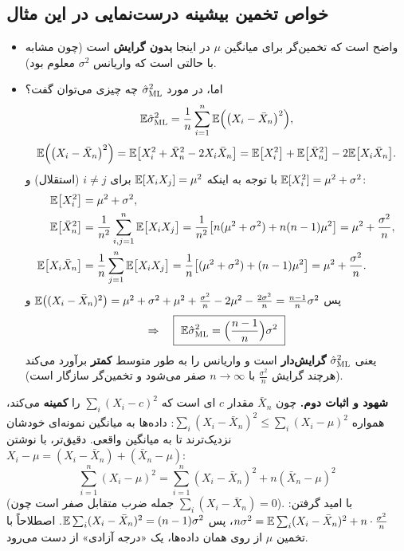 \subsection{خواص تخمین بیشینه درست‌نمایی در این مثال}
\begin{itemize}
\item واضح است که تخمین‌گر  برای میانگین $\mu$ در اینجا \textbf{بدون گرایش} است (چون مشابه با حالتی است که واریانس $\sigma^2$ معلوم بود).
\item اما، در مورد $\hat\sigma^2_{\mathrm{ML}}$ چه چیزی می‌توان گفت؟
\[
\mathbb{E}\hat\sigma^2_{\mathrm{ML}}=\frac1n\sum_{i=1}^n\mathbb{E}\Big(\big(X_i-\bar X_n\big)^2\Big),
\]
\[
\mathbb{E}\Big(\big(X_i-\bar X_n\big)^2\Big)=\mathbb{E}\big[X_i^2+\bar X_n^2-2X_i\bar X_n\big]=\mathbb{E}\big[X_i^2\big]+\mathbb{E}\big[\bar X_n^2\big]-2\mathbb{E}\big[X_i\bar X_n\big].
\]
با توجه به اینکه $\mathbb{E}[X_iX_j]=\mu^2$ برای $i\ne j$ (استقلال) و $\mathbb{E}[X_i^2]=\mu^2+\sigma^2$:
\[
\begin{aligned}
\mathbb{E}\big[X_i^2\big]&=\mu^2+\sigma^2,\\
\mathbb{E}\big[\bar X_n^2\big]&=\frac{1}{n^2}\sum_{i,j=1}^n\mathbb{E}\big[X_iX_j\big]=\frac{1}{n^2}\big[n(\mu^2+\sigma^2)+n(n-1)\mu^2\big]=\mu^2+\frac{\sigma^2}{n},\\
\mathbb{E}\big[X_i\bar X_n\big]&=\frac1n\sum_{j=1}^n\mathbb{E}\big[X_iX_j\big]=\frac1n\big[(\mu^2+\sigma^2)+(n-1)\mu^2\big]=\mu^2+\frac{\sigma^2}{n}.
\end{aligned}
\]
پس $\mathbb{E}\big((X_i-\bar X_n)^2\big)=\mu^2+\sigma^2+\mu^2+\frac{\sigma^2}n-2\mu^2-\frac{2\sigma^2}{n}=\frac{n-1}{n}\sigma^2$ و
\[
\Rightarrow\quad\boxed{\ \E\hat\sigma^2_\ML=\Big(\frac{n-1}{n}\Big)\sigma^2\ }
\]
یعنی $\hat\sigma^2_{\mathrm{ML}}$ \textbf{گرایش‌دار} است و واریانس را به طور متوسط \textbf{کمتر} برآورد می‌کند (هرچند گرایش $\frac{\sigma^2}{n}$ با $n\to\infty$ صفر می‌شود و تخمین‌گر سازگار است).
\end{itemize}

\begin{note}
\notetitle \textbf{شهود و اثبات دوم.} چون $\bar X_n$ مقدار $c$ ای است که $\sum_i(X_i-c)^2$ را \textbf{کمینه} می‌کند، همواره $\sum_i(X_i-\bar X_n)^2\le\sum_i(X_i-\mu)^2$: داده‌ها به میانگین نمونه‌ای خودشان نزدیک‌ترند تا به میانگین واقعی. دقیق‌تر، با نوشتن $X_i-\mu=(X_i-\bar X_n)+(\bar X_n-\mu)$:
\[
\sum_{i=1}^n(X_i-\mu)^2=\sum_{i=1}^n(X_i-\bar X_n)^2+n(\bar X_n-\mu)^2
\]
(جمله ضرب متقابل صفر است چون $\sum_i(X_i-\bar X_n)=0$). با امید گرفتن: $n\sigma^2=\mathbb{E}\sum_i(X_i-\bar X_n)^2+n\cdot\frac{\sigma^2}{n}$، پس $\mathbb{E}\sum_i(X_i-\bar X_n)^2=(n-1)\sigma^2$. اصطلاحاً با تخمین $\mu$ از روی همان داده‌ها، یک «درجه آزادی» از دست می‌رود.
\end{note}


